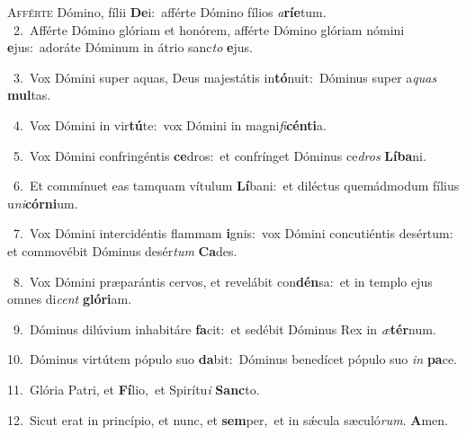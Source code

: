 \lettrine{\initial\textcolor{\initialcolor}{A}}{fférte} Dómino, fílii \textbf{De}\-i:~\star afférte Dómino fílios \textit{a}\-\textbf{rí}\textbf{e}tum.\\
{\numbfont\textcolor{\numbcolor}{~2.}}~Afférte Dómino glóriam et honórem, afférte Dómino glóriam nómini \textbf{e}\-jus:~\star adoráte Dóminum in átrio sanc\textit{to} \textbf{e}\-jus.\par
{\numbfont\textcolor{\numbcolor}{~3.}}~Vox Dómini super aquas, Deus majestátis in\-\textbf{tó}\-nuit:~\star Dóminus super a\textit{quas} \textbf{mul}\-tas.\par
{\numbfont\textcolor{\numbcolor}{~4.}}~Vox Dómini in vir\-\textbf{tú}\-te:~\star vox Dómini in magni\-\textit{fi}\-\textbf{cén}\textbf{ti}a.\par
{\numbfont\textcolor{\numbcolor}{~5.}}~Vox Dómini confringéntis \textbf{ce}\-dros:~\star et confrínget Dóminus ce\textit{dros} \textbf{Lí}\-\textbf{ba}ni.\par
{\numbfont\textcolor{\numbcolor}{~6.}}~Et commínuet eas tamquam vítulum \textbf{Lí}\-bani:~\star et diléctus quemádmodum fílius u\-\textit{ni}\-\textbf{cór}\textbf{ni}um.\par
{\numbfont\textcolor{\numbcolor}{~7.}}~Vox Dómini intercidéntis flammam \textbf{i}\-gnis:~\star vox Dómini concutiéntis desértum: et commovébit Dóminus desér\textit{tum} \textbf{Ca}\-des.\par
{\numbfont\textcolor{\numbcolor}{~8.}}~Vox Dómini præparántis cervos, et revelábit con\-\textbf{dén}\-sa:~\star et in templo ejus omnes di\textit{cent} \textbf{gló}\-\textbf{ri}am.\par
{\numbfont\textcolor{\numbcolor}{~9.}}~Dóminus dilúvium inhabitáre \textbf{fa}\-cit:~\star et sedébit Dóminus Rex in \textit{æ}\-\textbf{tér}num.\par
{\numbfont\textcolor{\numbcolor}{10.}}~Dóminus virtútem pópulo suo \textbf{da}\-bit:~\star Dóminus benedícet pópulo suo \textit{in} \textbf{pa}\-ce.\par
{\numbfont\textcolor{\numbcolor}{11.}}~Glória Patri, et \textbf{Fí}\-lio,~\star et Spirítu\textit{i} \textbf{Sanc}\-to.\par
{\numbfont\textcolor{\numbcolor}{12.}}~Sicut erat in princípio, et nunc, et \textbf{sem}\-per,~\star et in sǽcula sæculó\-\textit{rum}\-. \textbf{A}\-men.\par
